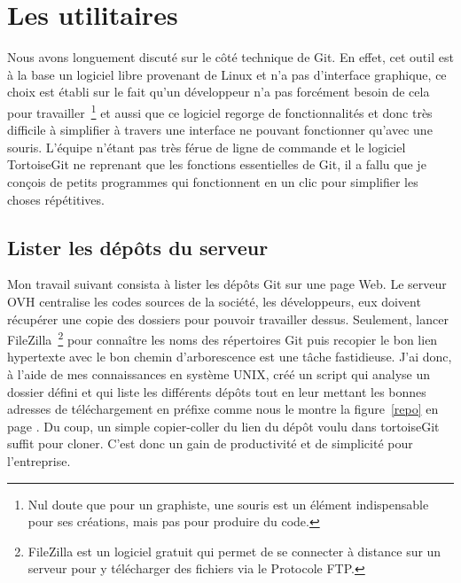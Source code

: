 \section{Les utilitaires} %
\label{sec:Les utilitaires}

Nous avons longuement discuté sur le côté technique de Git. En effet,
cet outil est à la base un logiciel libre provenant de Linux et n'a pas
d'interface graphique, ce choix est établi sur le fait qu'un développeur
n'a pas forcément besoin de cela pour travailler\, \footnote{Nul doute
que pour un graphiste, une souris est un élément indispensable pour ses
créations, mais pas pour produire du code.} et aussi que ce logiciel
regorge de fonctionnalités et donc très difficile à simplifier à travers
une interface ne pouvant fonctionner qu'avec une souris.  L'équipe
n'étant pas très férue de ligne de commande et le logiciel TortoiseGit
ne reprenant que les fonctions essentielles de Git, il a fallu que je
conçois de petits programmes qui fonctionnent en un clic pour simplifier
les choses répétitives.

\subsection{Lister les dépôts du serveur} %
\label{sub:Lister les dépôts du serveur}

Mon travail suivant consista à lister les dépôts Git sur une page Web.
Le serveur OVH centralise les codes sources de la société, les
développeurs, eux doivent récupérer une copie des dossiers pour pouvoir
travailler dessus. Seulement, lancer FileZilla\, \footnote{FileZilla
est un logiciel gratuit qui permet de se connecter à distance sur un
serveur pour y télécharger des fichiers via le Protocole FTP.} pour
connaître les noms des répertoires Git puis recopier le bon lien
hypertexte avec le bon chemin d'arborescence est une tâche fastidieuse.
J'ai donc, à l'aide de mes connaissances en système UNIX, créé un script
qui analyse un dossier défini et qui liste les différents dépôts tout en
leur mettant les bonnes adresses de téléchargement en préfixe comme nous
le montre la figure~\ref{repo} en page \pageref{repo}. Du coup, un
simple copier-coller du lien du dépôt voulu dans tortoiseGit suffit pour
cloner. C'est donc un gain de productivité et de simplicité pour
l'entreprise.

